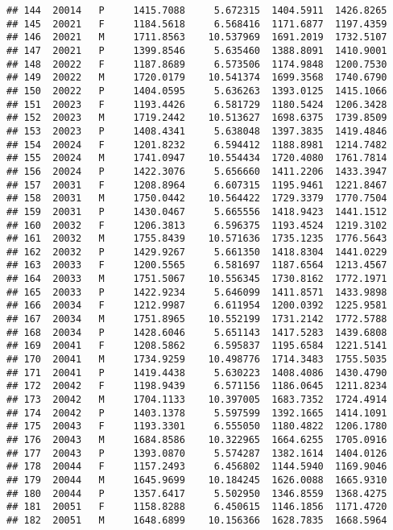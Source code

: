 \documentclass[]{article}
\begin{document}
\begin{verbatim}
## 144  20014   P     1415.7088     5.672315  1404.5911  1426.8265
## 145  20021   F     1184.5618     6.568416  1171.6877  1197.4359
## 146  20021   M     1711.8563    10.537969  1691.2019  1732.5107
## 147  20021   P     1399.8546     5.635460  1388.8091  1410.9001
## 148  20022   F     1187.8689     6.573506  1174.9848  1200.7530
## 149  20022   M     1720.0179    10.541374  1699.3568  1740.6790
## 150  20022   P     1404.0595     5.636263  1393.0125  1415.1066
## 151  20023   F     1193.4426     6.581729  1180.5424  1206.3428
## 152  20023   M     1719.2442    10.513627  1698.6375  1739.8509
## 153  20023   P     1408.4341     5.638048  1397.3835  1419.4846
## 154  20024   F     1201.8232     6.594412  1188.8981  1214.7482
## 155  20024   M     1741.0947    10.554434  1720.4080  1761.7814
## 156  20024   P     1422.3076     5.656660  1411.2206  1433.3947
## 157  20031   F     1208.8964     6.607315  1195.9461  1221.8467
## 158  20031   M     1750.0442    10.564422  1729.3379  1770.7504
## 159  20031   P     1430.0467     5.665556  1418.9423  1441.1512
## 160  20032   F     1206.3813     6.596375  1193.4524  1219.3102
## 161  20032   M     1755.8439    10.571636  1735.1235  1776.5643
## 162  20032   P     1429.9267     5.661350  1418.8304  1441.0229
## 163  20033   F     1200.5565     6.581697  1187.6564  1213.4567
## 164  20033   M     1751.5067    10.556345  1730.8162  1772.1971
## 165  20033   P     1422.9234     5.646099  1411.8571  1433.9898
## 166  20034   F     1212.9987     6.611954  1200.0392  1225.9581
## 167  20034   M     1751.8965    10.552199  1731.2142  1772.5788
## 168  20034   P     1428.6046     5.651143  1417.5283  1439.6808
## 169  20041   F     1208.5862     6.595837  1195.6584  1221.5141
## 170  20041   M     1734.9259    10.498776  1714.3483  1755.5035
## 171  20041   P     1419.4438     5.630223  1408.4086  1430.4790
## 172  20042   F     1198.9439     6.571156  1186.0645  1211.8234
## 173  20042   M     1704.1133    10.397005  1683.7352  1724.4914
## 174  20042   P     1403.1378     5.597599  1392.1665  1414.1091
## 175  20043   F     1193.3301     6.555050  1180.4822  1206.1780
## 176  20043   M     1684.8586    10.322965  1664.6255  1705.0916
## 177  20043   P     1393.0870     5.574287  1382.1614  1404.0126
## 178  20044   F     1157.2493     6.456802  1144.5940  1169.9046
## 179  20044   M     1645.9699    10.184245  1626.0088  1665.9310
## 180  20044   P     1357.6417     5.502950  1346.8559  1368.4275
## 181  20051   F     1158.8288     6.450615  1146.1856  1171.4720
## 182  20051   M     1648.6899    10.156366  1628.7835  1668.5964

\end{verbatim}
\end{document}
